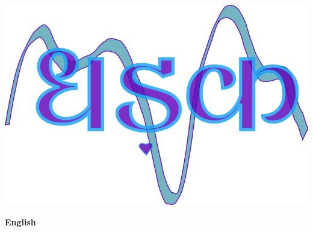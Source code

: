 \documentclass[10pt,a4paper]{article}
\begin{document}
			
	\begin{titlepage}
		\vspace*{5cm}
		{\centering
			
			\includegraphics[width=1\textwidth]{../common/logo.png}\par
		}
		\vspace{4cm}
		\hfil \Large\bfseries English \hfil
		\vfill
	\end{titlepage}

	
	\tableofcontents
	\pagebreak
	
		
	
	
	
	
	
	\pagebreak
	
\end{document}
